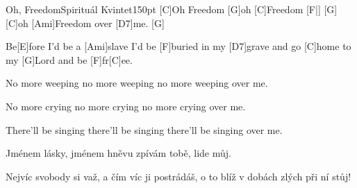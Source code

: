 \begin{song}{Oh, Freedom}{Spirituál Kvintet}{150pt}
%
[C]Oh Freedom [G]oh [C]Freedom [F|]{} [G]{}
[C]oh [Ami]Freedom over [D7]me. [G]{}

\chorus%
Be[E]fore I'd be a [Ami]slave
I'd be [F]buried in my [D7]grave
and go [C]home to my [G]Lord
and be [F]fr[C]ee.

%
No more weeping no more weeping
no more weeping over me.
\repchor

%
No more crying no more crying
no more crying over me.
\repchor

%
There'll be singing there'll be singing
there'll be singing over me.
\repchor

%
Jménem lásky, jménem hněvu
zpívám tobě, lide můj.

\chorus%
Nejvíc svobody si važ,
a čím víc ji postrádáš,
o to blíž v dobách zlých
při ní stůj!
\end{song}
